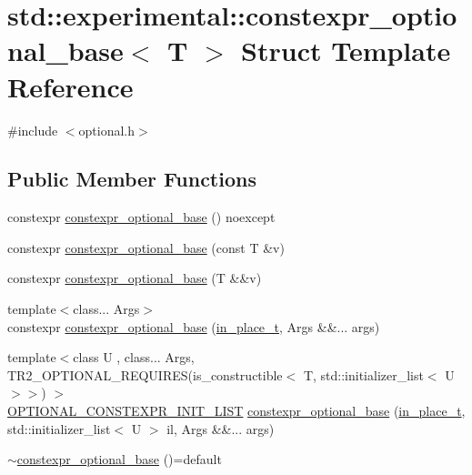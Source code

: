 \hypertarget{structstd_1_1experimental_1_1constexpr__optional__base}{}\section{std\+:\+:experimental\+:\+:constexpr\+\_\+optional\+\_\+base$<$ T $>$ Struct Template Reference}
\label{structstd_1_1experimental_1_1constexpr__optional__base}


{\ttfamily \#include $<$optional.\+h$>$}

\subsection*{Public Member Functions}
\begin{DoxyCompactItemize}
\item 
constexpr \mbox{\hyperlink{structstd_1_1experimental_1_1constexpr__optional__base_a2de68e8d50f3b54344372c96c2123327}{constexpr\+\_\+optional\+\_\+base}} () noexcept
\item 
constexpr \mbox{\hyperlink{structstd_1_1experimental_1_1constexpr__optional__base_a215e82b0c75a04e871f55ab74def5653}{constexpr\+\_\+optional\+\_\+base}} (const T \&v)
\item 
constexpr \mbox{\hyperlink{structstd_1_1experimental_1_1constexpr__optional__base_a7a1c2735a3d7c86bdd4e179f9e291444}{constexpr\+\_\+optional\+\_\+base}} (T \&\&v)
\item 
{\footnotesize template$<$class... Args$>$ }\\constexpr \mbox{\hyperlink{structstd_1_1experimental_1_1constexpr__optional__base_a0ad7ea00451f21b435d46658be3eace6}{constexpr\+\_\+optional\+\_\+base}} (\mbox{\hyperlink{structstd_1_1experimental_1_1in__place__t}{in\+\_\+place\+\_\+t}}, Args \&\&... args)
\item 
{\footnotesize template$<$class U , class... Args, T\+R2\+\_\+\+O\+P\+T\+I\+O\+N\+A\+L\+\_\+\+R\+E\+Q\+U\+I\+R\+E\+S(is\+\_\+constructible$<$ T, std\+::initializer\+\_\+list$<$ U $>$$>$) $>$ }\\\mbox{\hyperlink{optional_8h_a7399114ed1c146a67741cdd1f681fcb5}{O\+P\+T\+I\+O\+N\+A\+L\+\_\+\+C\+O\+N\+S\+T\+E\+X\+P\+R\+\_\+\+I\+N\+I\+T\+\_\+\+L\+I\+ST}} \mbox{\hyperlink{structstd_1_1experimental_1_1constexpr__optional__base_aca7f761fe8d8a0e12295a590ff901654}{constexpr\+\_\+optional\+\_\+base}} (\mbox{\hyperlink{structstd_1_1experimental_1_1in__place__t}{in\+\_\+place\+\_\+t}}, std\+::initializer\+\_\+list$<$ U $>$ il, Args \&\&... args)
\item 
\mbox{\hyperlink{structstd_1_1experimental_1_1constexpr__optional__base_aa45afb4ed80eab963e850ca337956a95}{$\sim$constexpr\+\_\+optional\+\_\+base}} ()=default
\end{DoxyCompactItemize}

